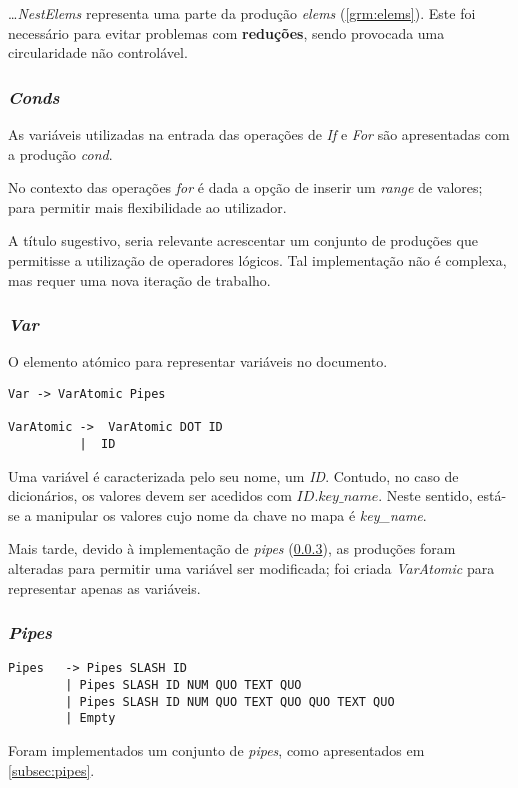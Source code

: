 \documentclass[../relatorio.tex]{subfiles}
\begin{document}
\dots \textit{NestElems} representa uma parte da produção 
\textit{elems} (\ref{grm:elems}). Este foi necessário para evitar problemas 
com \textbf{reduções}, sendo provocada uma circularidade não controlável.

\subsubsection{\textit{Conds}} \label{grm:conds}
As variáveis utilizadas na entrada das operações de \textit{If} e
\textit{For} são apresentadas com a produção \textit{cond}.

No contexto das operações \textit{for} é dada a opção 
de inserir um \textit{range} de valores; para permitir
mais flexibilidade ao utilizador.

A título sugestivo, seria relevante acrescentar um conjunto de produções
que permitisse a utilização de operadores lógicos.
Tal implementação não é complexa, mas requer uma nova iteração de trabalho.

\subsubsection{\textit{Var}} \label{grm:vars}
O elemento atómico para representar variáveis no documento.

\begin{verbatim}
Var -> VarAtomic Pipes

VarAtomic ->  VarAtomic DOT ID                          
          |  ID   
\end{verbatim}

Uma variável é caracterizada pelo seu nome, um \textit{ID}.
Contudo, no caso de dicionários, os valores devem ser acedidos 
com $ID.key\_name$.
Neste sentido, está-se a manipular os valores cujo nome da 
chave no mapa é \textit{key\_name}.

Mais tarde, devido à implementação de \textit{pipes} (\ref{grm:pipes}), 
as produções foram alteradas para permitir uma variável 
ser modificada; foi criada \textit{VarAtomic} para representar
apenas as variáveis.
 
\subsubsection{\textit{Pipes}} \label{grm:pipes}
\begin{verbatim}
Pipes   -> Pipes SLASH ID                                
        | Pipes SLASH ID NUM QUO TEXT QUO                
        | Pipes SLASH ID NUM QUO TEXT QUO QUO TEXT QUO   
        | Empty   
\end{verbatim}
Foram implementados um conjunto de \textit{pipes}, 
como apresentados em \ref{subsec:pipes}.
\end{document}
